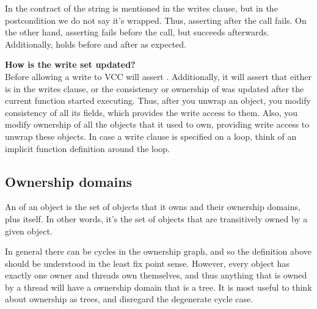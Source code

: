 
\noindent
In the contract of  the string  is mentioned
in the writes clause, but in the postcondition we do not say it's wrapped.
Thus, asserting  after the call fails.
On the other hand, asserting  fails before the call,
but succeeds afterwards.
Additionally,  holds before and after as expected.

\begin{note}
\textbf{How is the write set updated?} \\
Before allowing a write to  VCC will assert .
Additionally, it will assert that either  is in the writes
clause, or the consistency or ownership of  was updated after the current
function started executing.
Thus, after you unwrap an object, you modify consistency of all its fields,
which provides the write access to them.
Also, you modify ownership of all the objects that it used to own, providing
write access to unwrap these objects.
In case a write clause is specified on a loop, think of an implicit function
definition around the loop.
\end{note}

%
%
%

\subsection{Ownership domains}

An  of an object  is the set of objects
that it owns and their ownership domains, plus  itself.
In other words, it's the set of objects that are transitively
owned by a given object.

\begin{note}
In general there can be cycles in the ownership graph,
and so the definition above should be understood in the least fix point sense.
However, every object has exactly one owner and threads own themselves,
and thus anything that
is owned by a thread will have a ownership domain that is a tree.
It is most useful to think about ownership as trees, and disregard
the degenerate cycle case.
\end{note}

